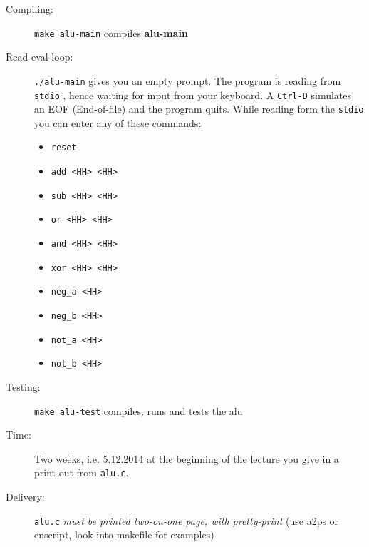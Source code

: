 \documentclass[a4paper]{article}
\begin{document}
\begin{description}
\item[Compiling:] \texttt{make alu-main} compiles \textbf{alu-main}
\item[Read-eval-loop:] \texttt{./alu-main} gives you an empty prompt. The program is reading from  \texttt{stdio} , hence waiting for input from your keyboard. A \texttt{Ctrl-D} simulates an EOF (End-of-file) and the program quits. While reading form the \texttt{stdio} you can enter any of these commands:
  \begin{itemize}
  \item \texttt{reset}
  \item \texttt{add <HH> <HH>}
  \item \texttt{sub <HH> <HH>}
  \item \texttt{or <HH> <HH>}
  \item \texttt{and <HH> <HH>}
  \item \texttt{xor <HH> <HH>}
  \item \texttt{neg\_a <HH>}
  \item \texttt{neg\_b <HH>}
  \item \texttt{not\_a <HH>}
  \item \texttt{not\_b <HH>}
  \end{itemize}
\item[Testing:] \texttt{make alu-test} compiles, runs and tests the alu
\item[Time:] Two weeks, i.e. 5.12.2014 at the beginning of the lecture you give in a print-out from \texttt{alu.c}.
\item[Delivery:] \texttt{alu.c} \emph{must be printed two-on-one page, with pretty-print} (use a2ps or enscript, look into makefile for examples)
\end{description}
\end{document}
